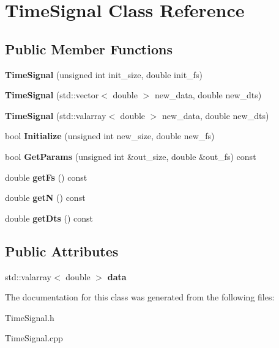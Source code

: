 \hypertarget{classTimeSignal}{}\section{Time\+Signal Class Reference}
\label{classTimeSignal}
\subsection*{Public Member Functions}
\begin{DoxyCompactItemize}
\item 
\mbox{\label{classTimeSignal_a18c73bd0180e6b9241285c3227af56a3}} 
{\bfseries Time\+Signal} (unsigned int init\+\_\+size, double init\+\_\+fs)
\item 
\mbox{\label{classTimeSignal_ae88ab335c2c3dfbb8e07c0590fe5efba}} 
{\bfseries Time\+Signal} (std\+::vector$<$ double $>$ new\+\_\+data, double new\+\_\+dts)
\item 
\mbox{\label{classTimeSignal_a3c2410005a4590869c53d82dbda73865}} 
{\bfseries Time\+Signal} (std\+::valarray$<$ double $>$ new\+\_\+data, double new\+\_\+dts)
\item 
\mbox{\label{classTimeSignal_af49b9ec38759f4beccd2f3ea916c35d4}} 
bool {\bfseries Initialize} (unsigned int new\+\_\+size, double new\+\_\+fs)
\item 
\mbox{\label{classTimeSignal_af9aaab7eb101e1d9cac1357d7dc1cd53}} 
bool {\bfseries Get\+Params} (unsigned int \&out\+\_\+size, double \&out\+\_\+fs) const
\item 
\mbox{\label{classTimeSignal_af9b98d58fecd651bfa6e16e3bdf07822}} 
double {\bfseries get\+Fs} () const
\item 
\mbox{\label{classTimeSignal_ac6947c6308ad45b5da56b6f440bb6bc7}} 
double {\bfseries getN} () const
\item 
\mbox{\label{classTimeSignal_aed0b0e8d40fc8806e15a18ed04962ef7}} 
double {\bfseries get\+Dts} () const
\end{DoxyCompactItemize}
\subsection*{Public Attributes}
\begin{DoxyCompactItemize}
\item 
\mbox{\label{classTimeSignal_a8f98454a1d25f7d01d8bb7314597f2e9}} 
std\+::valarray$<$ double $>$ {\bfseries data}
\end{DoxyCompactItemize}


The documentation for this class was generated from the following files\+:\begin{DoxyCompactItemize}
\item 
Time\+Signal.\+h\item 
Time\+Signal.\+cpp\end{DoxyCompactItemize}
